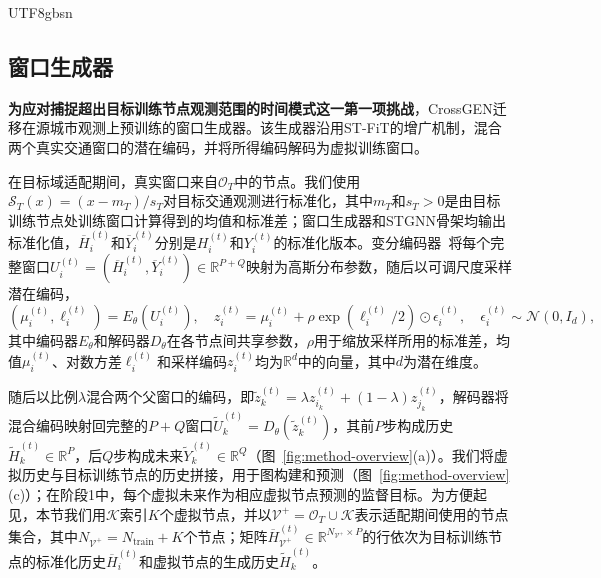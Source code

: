 \documentclass[runningheads,a4paper]{llncs}
\begin{document}
\begin{CJK*}{UTF8}{gbsn}
\subsection{窗口生成器}
\label{sec:node-generator}

\textbf{为应对捕捉超出目标训练节点观测范围的时间模式这一第一项挑战}，CrossGEN迁移在源城市观测上预训练的窗口生成器。该生成器沿用ST-FiT的增广机制，混合两个真实交通窗口的潜在编码，并将所得编码解码为虚拟训练窗口。

在目标域适配期间，真实窗口来自$\mathcal O_T$中的节点。我们使用$\mathcal S_T(x)=(x-m_T)/s_T$对目标交通观测进行标准化，其中$m_T$和$s_T>0$是由目标训练节点处训练窗口计算得到的均值和标准差；窗口生成器和STGNN骨架均输出标准化值，$\overline H_i^{(t)}$和$\overline Y_i^{(t)}$分别是$H_i^{(t)}$和$Y_i^{(t)}$的标准化版本。变分编码器~\cite{vae}将每个完整窗口$U_i^{(t)}=(\overline H_i^{(t)},\overline Y_i^{(t)})\in\mathbb R^{P+Q}$映射为高斯分布参数，随后以可调尺度采样潜在编码，
\begin{equation}
  (\mu_i^{(t)},\ell_i^{(t)})=E_\theta(U_i^{(t)}),\quad
  z_i^{(t)}=\mu_i^{(t)}+\rho\exp(\ell_i^{(t)}/2)\odot\epsilon_i^{(t)},\quad
  \epsilon_i^{(t)}\sim\mathcal N(0,I_d),
  \label{eq:latent-code}
\end{equation}
其中编码器$E_\theta$和解码器$D_\theta$在各节点间共享参数，$\rho$用于缩放采样所用的标准差，均值$\mu_i^{(t)}$、对数方差$\ell_i^{(t)}$和采样编码$z_i^{(t)}$均为$\mathbb R^d$中的向量，其中$d$为潜在维度。

随后以比例$\lambda$混合两个父窗口的编码，即$\widetilde z_k^{(t)}=\lambda z_{i_k}^{(t)}+(1-\lambda)z_{j_k}^{(t)}$，解码器将混合编码映射回完整的$P+Q$窗口$\widetilde U_k^{(t)}=D_\theta(\widetilde z_k^{(t)})$，其前$P$步构成历史$\widetilde H_k^{(t)}\in\mathbb R^P$，后$Q$步构成未来$\widetilde Y_k^{(t)}\in\mathbb R^Q$（图~\ref{fig:method-overview}(a)）。我们将虚拟历史与目标训练节点的历史拼接，用于图构建和预测（图~\ref{fig:method-overview}(c)）；在阶段1中，每个虚拟未来作为相应虚拟节点预测的监督目标。为方便起见，本节我们用$\mathcal K$索引$K$个虚拟节点，并以$\mathcal V^{+}=\mathcal O_T\cup\mathcal K$表示适配期间使用的节点集合，其中$N_{\mathcal V^{+}}=N_{\mathrm{train}}+K$个节点；矩阵$\overline H_{\mathcal V^{+}}^{(t)}\in\mathbb R^{N_{\mathcal V^{+}}\times P}$的行依次为目标训练节点的标准化历史$\overline H_i^{(t)}$和虚拟节点的生成历史$\widetilde H_k^{(t)}$。


\end{CJK*}
\end{document}
